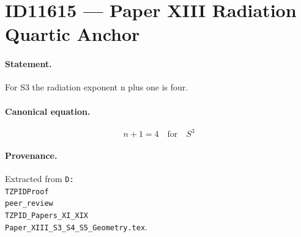 \section*{ID11615 --- Paper XIII Radiation Quartic Anchor}

\paragraph{Statement.}
For S3 the radiation exponent n plus one is four.

\paragraph{Canonical equation.}
\[
n+1=4\quad\text{for}\quad S^3
\]

\paragraph{Provenance.}
Extracted from \texttt{D:\\TZPIDProof\\peer\_review\\TZPID\_Papers\_XI\_XIX\\Paper\_XIII\_S3\_S4\_S5\_Geometry.tex}.
